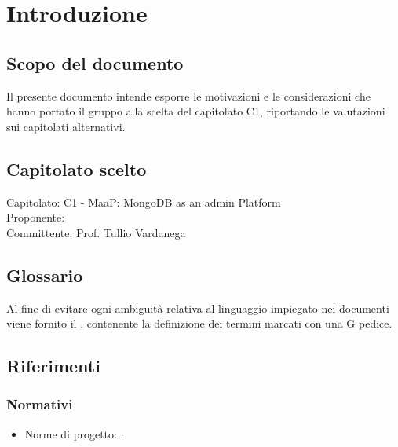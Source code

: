 \section{Introduzione}

\subsection{Scopo del documento}
Il presente documento intende esporre le motivazioni e le considerazioni che hanno portato il gruppo alla scelta del capitolato C1, riportando le valutazioni sui capitolati alternativi.

\subsection{Capitolato scelto}
Capitolato: C1 - MaaP: MongoDB as an admin Platform\\
Proponente: \Proponente{} \\
Committente: Prof. Tullio Vardanega \\

\subsection{Glossario}
Al fine di evitare ogni ambiguità relativa al linguaggio impiegato nei documenti viene fornito il \Glossario, contenente la definizione dei termini marcati con una G pedice.

\subsection{Riferimenti}

	\subsubsection{Normativi}
	\begin{itemize}
		\item Norme di progetto: \NormeDiProgetto .
	\end{itemize}

